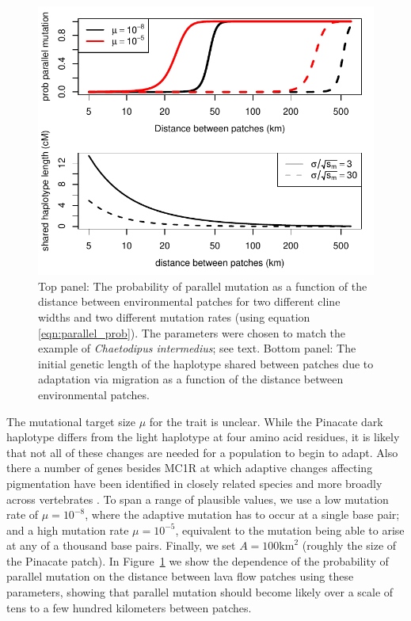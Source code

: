 \documentclass{article}
\newcommand{\citep}[1]{\cite{#1}}
\begin{document}
\begin{figure}[ht]
  \begin{center}
    \includegraphics{Lava_flow_mice_prob_parallel}
  \end{center}
  \caption{
Top panel: The probability of parallel mutation as a function of the distance
between environmental patches for two different cline widths
and two different mutation rates (using equation \eqref{eqn:parallel_prob}). 
The parameters were chosen to match the example of \textit{Chaetodipus intermedius};
see text. Bottom panel: The initial genetic length of the haplotype
shared between patches due to adaptation via migration as a function
of the distance between environmental patches. 
  \label{fig:mice_prob_parallel}
  }
\end{figure}

The mutational target size $\mu$ for the trait is unclear. 
While the Pinacate dark haplotype differs from the light haplotype at four amino acid residues,
it is likely that not all of these changes are needed for a population to begin to adapt. 
Also there a number of genes besides MC1R at which adaptive changes affecting pigmentation 
have been identified in closely related species and more broadly across vertebrates \citep{Hoekstra:06}.
To span a range of plausible values, we use a low mutation rate of $\mu= 10^{-8}$, 
where the adaptive mutation has to occur at a single base pair; 
and a high mutation rate $\mu= 10^{-5}$, equivalent to the mutation
being able to arise at any of a thousand base pairs.  
Finally, we set $A=100\text{km}^2$ (roughly the size of the Pinacate
patch). In
Figure~\ref{fig:mice_prob_parallel} we show the dependence of the probability
of parallel mutation on the distance between lava flow patches using these parameters, 
showing that parallel mutation should become
likely over a scale of tens to a few hundred kilometers between patches. 
\end{document}
